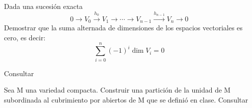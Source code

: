 \begin{problem}[5]

Dada una sucesión exacta \[ 0 \to V_0 \xrightarrow{h_0} V_1 \to \dotsb \to V_{n-1} \xrightarrow{h_{n-1}} V_{n} \to 0 \] Demostrar que la suma alternada de dimensiones de los espacios vectoriales es cero, es decir:  \[ \sum_{i=0}^n (-1)^i \dim V_i = 0\]


\solution

Consultar 

\end{problem}

\begin{problem}[6]
Sea M una variedad compacta. Construir una partición de la unidad de M subordinada al cubrimiento por abiertos de M que se definió en clase.
\solution
Consultar 
\end{problem}

